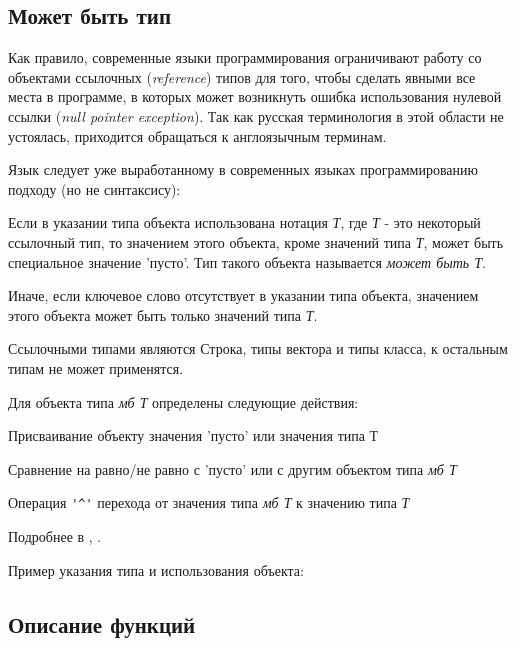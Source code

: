 \hypertarget{mb-types}{%
\subsection{Может быть тип}\label{decls:mb-types}}

Как правило, современные языки программирования ограничивают работу со объектами ссылочных (\emph{reference}) типов для того, 
чтобы сделать явными все места в программе, в которых может возникнуть ошибка использования нулевой ссылки (\emph{null pointer exception}). 
Так как русская терминология в этой области не устоялась, приходится обращаться к англоязычным терминам.

Язык \thelang{} следует уже выработанному в современных языках программированию подходу (но не синтаксису):
\begin{d_itemize}
\item
    Если в указании типа объекта использована нотация \emph{ Т}, где \emph{Т} - это некоторый ссылочный тип,  
    то значением этого объекта, кроме значений типа \emph{Т}, может быть специальное значение 'пусто'. Тип такого объекта называется \emph{может быть Т}.
\item
    Иначе, если ключевое слово  отсутствует в указании типа объекта, значением этого объекта может быть только значений типа \emph{Т}.
\end{d_itemize}

Ссылочными типами являются Строка, типы вектора и типы класса, к остальным типам  не может применятся.

Для объекта типа \emph{мб Т} определены следующие действия:
\begin{d_itemize}
\item
    Присваивание объекту значения 'пусто' или значения типа Т
\item
    Сравнение на равно/не равно с 'пусто'  или с другим объектом типа \emph{мб Т}
\item
    Операция \verb+'^'+ перехода от значения типа \emph{мб Т} к значению типа \emph{Т}
\end{d_itemize}
Подробнее в  , .

\bigskip
Пример указания типа и использования объекта:


\hypertarget{functions}{%
\subsection{Описание функций}\label{decls:functions}}

